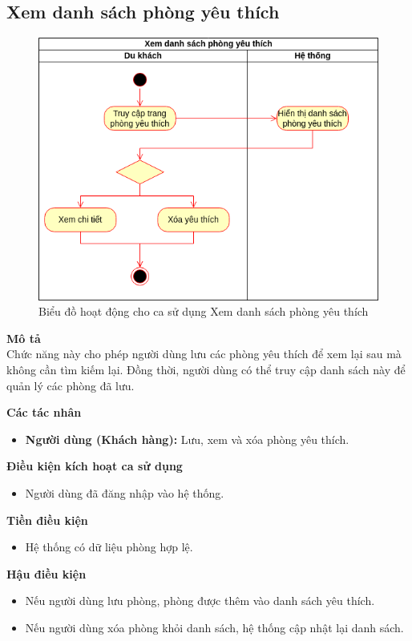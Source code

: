 \subsection{Xem danh sách phòng yêu thích}
\begin{figure}[H]
    \centering
    \includegraphics[width=\textwidth]{img/1.Tuyền-Xem danh sách phòng yêu thích.drawio.png}
    \caption{Biểu đồ hoạt động cho ca sử dụng Xem danh sách phòng yêu thích}
\end{figure}
\textbf{\indent Mô tả}\\
\indent Chức năng này cho phép người dùng lưu các phòng yêu thích để xem lại sau mà không cần tìm kiếm lại. Đồng thời, người dùng có thể truy cập danh sách này để quản lý các phòng đã lưu.

\textbf{Các tác nhân}
\begin{itemize}
    \item \textbf{Người dùng (Khách hàng):} Lưu, xem và xóa phòng yêu thích.
\end{itemize}

\textbf{Điều kiện kích hoạt ca sử dụng}
\begin{itemize}
    \item Người dùng đã đăng nhập vào hệ thống.
\end{itemize}

\textbf{Tiền điều kiện}
\begin{itemize}
    \item Hệ thống có dữ liệu phòng hợp lệ.
\end{itemize}

\textbf{Hậu điều kiện}
\begin{itemize}
    \item Nếu người dùng lưu phòng, phòng được thêm vào danh sách yêu thích.
    \item Nếu người dùng xóa phòng khỏi danh sách, hệ thống cập nhật lại danh sách.
\end{itemize}

